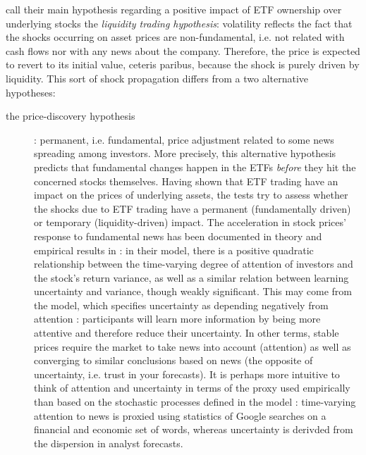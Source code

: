 \cite{Ben-David2018} call their main hypothesis regarding a positive impact of ETF ownership over underlying stocks the \emph{liquidity trading hypothesis}: volatility reflects the fact that the shocks occurring on asset prices are non-fundamental, i.e. not related with cash flows nor with any news about the company. Therefore, the price is expected to revert to its initial value, ceteris paribus, because the shock is purely driven by liquidity. This sort of shock propagation differs from a two alternative hypotheses:
\begin{description}
\item[the price-discovery hypothesis]: permanent, i.e. fundamental, price adjustment related to some news spreading among investors. More precisely, this alternative hypothesis predicts that fundamental changes happen in the ETFs \emph{before} they hit the concerned stocks themselves. Having shown that ETF trading have an impact on the prices of underlying assets, the tests try to assess whether the shocks due to ETF trading have a permanent (fundamentally driven) or temporary (liquidity-driven) impact. The acceleration in stock prices' response to fundamental news has been documented in theory and empirical results in \cite{Andrei2015} : in their model, there is a positive quadratic relationship between the time-varying degree of attention of investors and the stock's return variance, as well as a similar relation between learning uncertainty and variance, though weakly significant. This may come from the model, which specifies uncertainty as depending negatively from attention :  participants will learn more information by being more attentive and therefore reduce their uncertainty. In other terms, stable prices require the market to take news into account (attention) as well as converging to similar conclusions based on news (the opposite of uncertainty, i.e. trust in your forecasts). It is perhaps more intuitive to think of attention and uncertainty in terms of the proxy used empirically than based on the stochastic processes defined in the model : time-varying attention to news is proxied using statistics of Google searches on a financial and economic set of words, whereas uncertainty is derivded from the dispersion in analyst forecasts.

\end{description}
